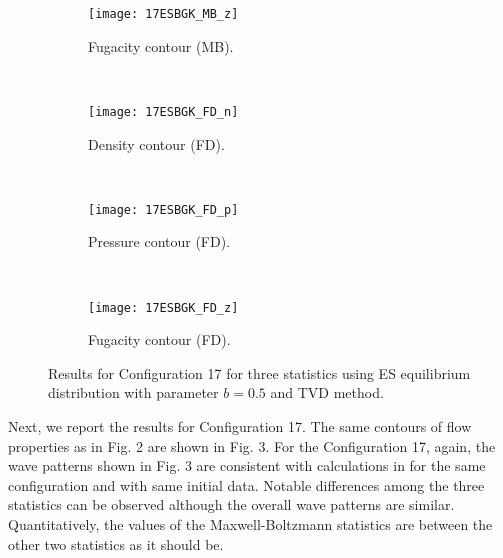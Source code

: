 \documentclass{rsproca}%
\begin{document}
\begin{figure}
\begin{subfigure}[b]{0.32\textwidth}
                \centering
                \texttt{[image: 17ESBGK\_MB\_z]}
                \caption{Fugacity contour (MB).}
                \label{fig:17ESBGK_MB_z}
        \end{subfigure}
        ~ %
        \begin{subfigure}[b]{0.32\textwidth}
                \centering
                \texttt{[image: 17ESBGK\_FD\_n]}
                \caption{Density contour (FD).}
                \label{fig:17ESBGK_FD_n}
        \end{subfigure}
        ~ %
        \begin{subfigure}[b]{0.32\textwidth}
                \centering
                \texttt{[image: 17ESBGK\_FD\_p]}
                \caption{Pressure contour (FD).}
                \label{fig:17ESBGK_FD_p}
        \end{subfigure}
				~ %
        \begin{subfigure}[b]{0.32\textwidth}
                \centering
                \texttt{[image: 17ESBGK\_FD\_z]}
                \caption{Fugacity contour (FD).}
                \label{fig:17ESBGK_FD_z}
        \end{subfigure}
				\caption{Results for Configuration 17 for three statistics using ES equilibrium distribution with parameter $b=0.5$ and TVD method.} \label{fig:test_configuration17}
\end{figure}
Next, we report the results for Configuration 17.  The same contours of flow properties as in Fig. 2 are shown in Fig. 3.
For the Configuration 17, again, the wave patterns shown in Fig. 3 are consistent with calculations in \cite{Laxliu95}\cite{schultzrinne} for the same configuration and with same initial data.   Notable differences among the three statistics can be observed although the overall wave patterns are similar.  Quantitatively, the values of the Maxwell-Boltzmann statistics are between the other two statistics as it should be.
\end{document}
